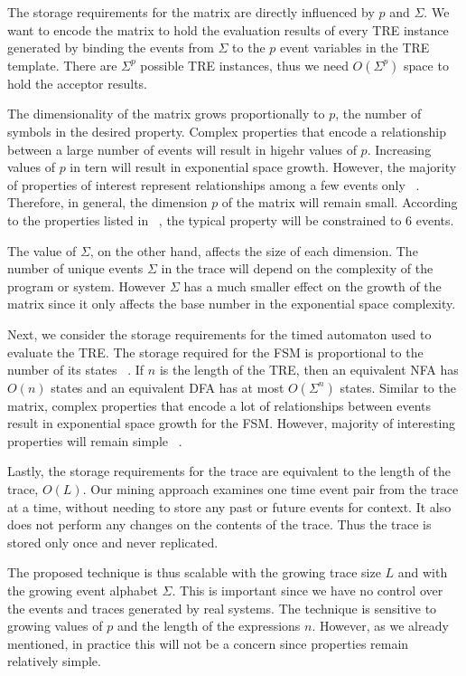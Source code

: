 \documentclass[]{sigplanconf}
\begin{document}
The storage requirements for the matrix are directly influenced by $p$ and $\Sigma$.
We want to encode the matrix to hold the evaluation results of every TRE instance generated by binding the events from $\Sigma$ to the $p$ event variables in the TRE template. There are $\Sigma^p$ possible TRE instances, thus we need $O(\Sigma^p)$ space to hold the acceptor results.

The dimensionality of the matrix grows proportionally to $p$, the number of symbols in the desired property.
Complex properties that encode a relationship between a large number of events will result in higehr values of $p$.
Increasing values of $p$ in tern will result in exponential space growth.
However, the majority of properties of interest represent relationships among a few events only ~\cite{evans1, dwyer1999patterns}.
Therefore, in general, the dimension $p$ of the matrix will remain small.
According to the properties listed in ~\cite{dwyer1999patterns, dwyer2}, the typical property will be constrained to 6 events.

The value of $\Sigma$, on the other hand, affects the size of each dimension.
The number of unique events $\Sigma$ in the trace will depend on the complexity of the program or system.
However $\Sigma$ has a much smaller effect on the growth of the matrix since it only affects the base number in the
exponential space complexity.


Next, we consider the storage requirements for the timed automaton used to evaluate the TRE.
The storage required for the FSM is proportional to the number of its states ~\cite{book1}.
If $n$ is the length of the TRE, then an equivalent NFA has $O(n)$ states and an equivalent DFA has at most $O(\Sigma^n)$ states. Similar to the matrix, complex properties that encode a lot of relationships between events result in exponential space growth for the FSM. However, majority of interesting properties will remain simple ~\cite{dwyer1999patterns}.


Lastly, the storage requirements for the trace are equivalent to the length of the trace, $O(L)$.
Our mining approach examines one time event pair from the trace at a time, without needing to
store any past or future events for context. It also does not perform any changes on the
contents of the trace. Thus the trace is stored only once and never replicated.


The proposed technique is thus scalable with the growing trace size $L$ and with the growing event alphabet $\Sigma$. This is important since we have no control over the events and traces generated by real systems. The technique is sensitive to growing values of $p$ and the length of the expressions $n$. However, as we already mentioned, in practice this will not be a concern since properties remain relatively simple.
\end{document}
